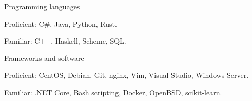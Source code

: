 
\begin{cventries}
  \cventry
    {} %
    {Programming languages} %
    {}
    {}
    {
      \begin{cvitems} %
         \item {Proficient: C\#, Java, Python, Rust.}
         \vspace{0.5mm}
         \item {Familiar: C++, Haskell, Scheme, SQL.}
      \end{cvitems}
    }
    
  \cventry
    {} %
    {Frameworks and software} %
    {}
    {}
    {
      \begin{cvitems} %
         \item {Proficient: CentOS, Debian, Git, nginx, Vim, Visual Studio, Windows Server.}
         \vspace{0.5mm}
         \item {Familiar: .NET Core, Bash scripting, Docker, OpenBSD, scikit-learn.}
      \end{cvitems}
    }
\end{cventries}
